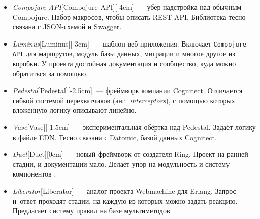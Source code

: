 \begin{itemize}


\item
  \emph{Compojure API}[Compojure API][-4cm]~---
  убер-надстройка над обычным Compojure. Набор макросов, чтобы описать REST
  API. Библиотека тесно связана с JSON-схемой и Swagger.


\item
  \emph{Luminus}[Luminus][-3cm]~--- шаблон
  веб-приложения. Включает \verb|Compojure API| для маршрутов, модуль базы
  данных, миграции и многое другое из коробки. У проекта достойная документация
  и сообщество, куда можно обратиться за помощью.


\item
  \emph{Pedestal}[Pedestal][-2.5cm]~--- фреймворк
  компании Cognitect. Отличается гибкой системой перехватчиков
  (анг. \emph{interceptors}), с помощью которых вложенную логику описывают
  линейно.


\item
  \emph{Vase}[Vase][-1.5cm]~---
  экспериментальная обёртка над Pedestal. Задаёт логику в файле
  EDN. Тесно связана с Datomic, базой данных Cognitect.


\item
  \emph{Duct}[Duct][0cm]~--- новый
  фреймворк от создателя Ring. Проект на ранней стадии, и документации
  мало. Делает упор на модульность и систему компонентов .


\item
  \emph{Liberator}[Liberator]~---
  аналог проекта Webmachine для Erlang. Запрос и~ответ проходят стадии, на
  каждую из которых можно задать реакцию. Предлагает систему правил на базе
  мультиметодов.

\end{itemize}

